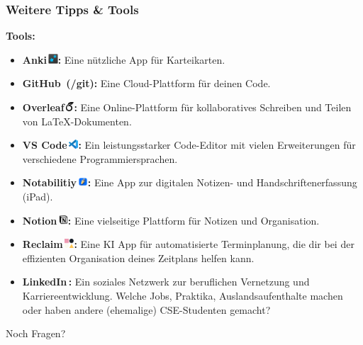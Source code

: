 \documentclass[10pt,a4paper]{beamer}
\begin{document}
    \begin{frame}
        \frametitle{Weitere Tipps \& Tools}
        \vfill
        \textbf{Tools:}
        \vfill
        \begin{itemize}
            \item \textbf{Anki\,\includegraphics[height=10pt]{bilder/anki.png}:} Eine nützliche App für Karteikarten.
            \vfill
            \item \textbf{GitHub\, (/git):} Eine Cloud-Plattform für deinen Code.
            \vfill
            \item \textbf{Overleaf\,\includegraphics[height=10pt]{bilder/overleaf.png}:} Eine Online-Plattform für kollaboratives Schreiben und Teilen von LaTeX-Dokumenten.
            \vfill
            \item \textbf{VS Code\,\includegraphics[height=10pt]{bilder/vs-code.png}:} Ein leistungsstarker Code-Editor mit vielen Erweiterungen für verschiedene Programmiersprachen.
            \vfill
            \item \textbf{Notabilitiy\,\includegraphics[height=10pt]{bilder/notability.png}:} Eine App zur digitalen Notizen- und Handschriftenerfassung (iPad).
            \vfill
            \item \textbf{Notion\,\includegraphics[height=10pt]{bilder/notion.png}:} Eine vielseitige Plattform für Notizen und Organisation.
            \vfill
            \item \textbf{Reclaim\,\includegraphics[height=10pt]{bilder/reclaim.png}:} Eine KI App für automatisierte Terminplanung, die dir bei der effizienten Organisation deines Zeitplans helfen kann.
            \vfill
            \item \textbf{LinkedIn\,:} Ein soziales Netzwerk zur beruflichen Vernetzung und Karriereentwicklung. Welche Jobs, Praktika, Auslandsaufenthalte machen oder haben andere (ehemalige) CSE-Studenten gemacht?
        \end{itemize}
        \vfill
    \end{frame}

    \begin{frame}
        \begin{center}
            \Huge{Noch Fragen?}
        \end{center}
    \end{frame}
\end{document}
